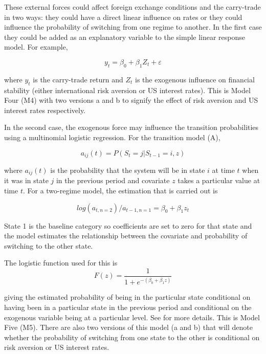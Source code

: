 \documentclass[12pt, a4paper, oneside]{article}\usepackage[]{graphicx}\usepackage[]{color}
\begin{document}
These external forces could affect foreign exchange conditions and the carry-trade in two ways:  they could have a direct linear influence on rates or they could influence the probability of switching from one regime to another.  In the first case they could be added as an explanatory variable to the simple linear response model. For example, 

\begin{equation}
\label{eqref:vix}
y_t = \beta_0 + \beta_1 Z_t + \varepsilon
\end{equation}

where $y_t$ is the carry-trade return and $Z_t$ is the exogenous influence on financial stability (either international risk aversion or US interest rates). This is Model Four (M4) with two versions a and b to signify the effect of risk aversion and US interest rates respectively.  

In the second case, the exogenous force may influence the transition probabilities using a multinomial logistic regression. For the transition model (A), 

\begin{equation}
a_{ij}(t) = P(S_t = j|S_{t-1} = i, z)
\end{equation}

where $a_{ij}(t)$ is the probability that the system will be in state $i$ at time $t$ when it was in state $j$ in the previous period and  covariate $z$ takes a particular value at time $t$.  For a two-regime model, the  estimation that is carried out is 

\begin{equation}
log(a_{t,n = 2})/ a_{t-1, n = 1} = \beta_{0} +\beta_1 z_t 
\end{equation}

State 1 is the baseline category so coefficients are set to zero for that state and the model estimates the relationship between the covariate and probability of switching to the other state. 

The logistic function used for this is 
\begin{equation} 
F(z)  = \frac{1}{1 + e^{-(\beta_0 + \beta_1 z)}}
\label{eqref:zcov}
\end{equation}
 
giving the estimated probability of being in the particular state conditional on having been in a particular state in the previous period and conditional on the exogenous variable being at a particular level.  See \citet[pp.174-75]{agresti2014categorical} for more details.  This is Model Five (M5). There are also two versions of this model (a and b) that will denote whether the probability of switching from one state to the other is conditional on risk aversion or US interest rates. 
\end{document}
